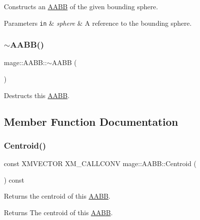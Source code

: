 Constructs an \hyperlink{classmage_1_1_a_a_b_b}{A\+A\+BB} of the given bounding sphere.


\begin{DoxyParams}[1]{Parameters}
\mbox{\tt in}  & {\em sphere} & A reference to the bounding sphere. \\
\hline
\end{DoxyParams}
\hypertarget{classmage_1_1_a_a_b_b_a0fa31372f7488cb30b886c77bd676f17}{}\label{classmage_1_1_a_a_b_b_a0fa31372f7488cb30b886c77bd676f17} 
\subsubsection{\texorpdfstring{$\sim$\+A\+A\+B\+B()}{~AABB()}}
{\footnotesize\ttfamily mage\+::\+A\+A\+B\+B\+::$\sim$\+A\+A\+BB (\begin{DoxyParamCaption}{ }\end{DoxyParamCaption})\hspace{0.3cm}{\ttfamily [default]}}

Destructs this \hyperlink{classmage_1_1_a_a_b_b}{A\+A\+BB}. 

\subsection{Member Function Documentation}
\hypertarget{classmage_1_1_a_a_b_b_a7555db5bea72d1e7ba04931fcbb88aa0}{}\label{classmage_1_1_a_a_b_b_a7555db5bea72d1e7ba04931fcbb88aa0} 
\subsubsection{\texorpdfstring{Centroid()}{Centroid()}}
{\footnotesize\ttfamily const X\+M\+V\+E\+C\+T\+OR X\+M\+\_\+\+C\+A\+L\+L\+C\+O\+NV mage\+::\+A\+A\+B\+B\+::\+Centroid (\begin{DoxyParamCaption}{ }\end{DoxyParamCaption}) const\hspace{0.3cm}{\ttfamily [noexcept]}}

Returns the centroid of this \hyperlink{classmage_1_1_a_a_b_b}{A\+A\+BB}.

\begin{DoxyReturn}{Returns}
The centroid of this \hyperlink{classmage_1_1_a_a_b_b}{A\+A\+BB}. 
\end{DoxyReturn}
\hypertarget{classmage_1_1_a_a_b_b_ad3e011e47a16a9ecb84811296bbbcb1c}{}\label{classmage_1_1_a_a_b_b_ad3e011e47a16a9ecb84811296bbbcb1c} 

